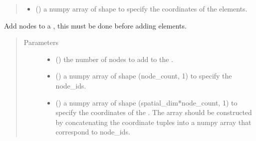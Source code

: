 \documentclass[letterpaper,10pt,english]{sphinxmanual}
\begin{document}
\begin{fulllineitems}
\begin{fulllineitems}
\begin{quote}
\begin{description}
\begin{itemize}
\item {} 
 () \textendash{} a numpy array of shape
 to specify the coordinates of the elements.

\end{itemize}

\end{description}\end{quote}

\end{fulllineitems}


\begin{fulllineitems}
\label{\detokenize{mesh:ESMF.api.mesh.Mesh.add_nodes}}
Add nodes to a {\hyperref[\detokenize{mesh:ESMF.api.mesh.Mesh}]{}}, this must be done before adding elements.
\begin{quote}\begin{description}
\item[{Parameters}] \leavevmode\begin{itemize}
\item {} 
 () \textendash{} the number of nodes to add to the {\hyperref[\detokenize{mesh:ESMF.api.mesh.Mesh}]{}}.

\item {} 
 () \textendash{} a numpy array of shape (node\_count, 1) to
specify the node\_ids.

\item {} 
 () \textendash{} a numpy array of shape
(spatial\_dim*node\_count, 1) to specify the coordinates of the {\hyperref[\detokenize{mesh:ESMF.api.mesh.Mesh}]{}}.
The array should be constructed by concatenating the coordinate
tuples into a numpy array that correspond to node\_ids.


\end{itemize}
\end{description}
\end{quote}
\end{fulllineitems}
\end{fulllineitems}
\end{document}
